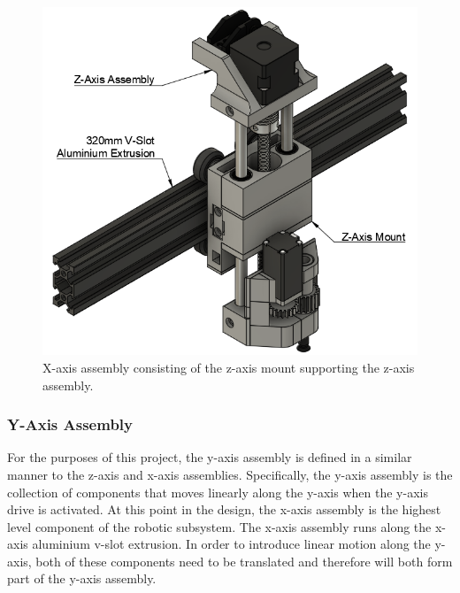 \begin{figure}[H]
	\centering
	\includegraphics[width=0.8\linewidth]{figures/x-axis-assembly.png}
	\caption{X-axis assembly consisting of the z-axis mount supporting the z-axis assembly.}
	\label{fig:x-axis-assembly}
\end{figure}

\subsubsection{Y-Axis Assembly}

For the purposes of this project, the y-axis assembly is defined in a similar manner to the z-axis and x-axis assemblies. Specifically, the y-axis assembly is the collection of components that moves linearly along the y-axis when the y-axis drive is activated. At this point in the design, the x-axis assembly is the highest level component of the robotic subsystem. The x-axis assembly runs along the x-axis aluminium v-slot extrusion. In order to introduce linear motion along the y-axis, both of these components need to be translated and therefore will both form part of the y-axis assembly.

